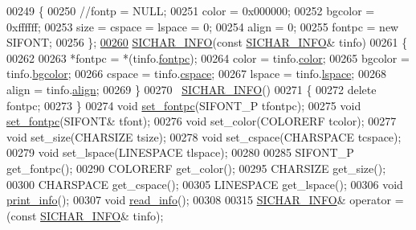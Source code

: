 \begin{DoxyCode}
00249     \{
00250         \textcolor{comment}{//fontp = NULL;}
00251         color = 0x000000;
00252         bgcolor = 0xffffff;
00253         size = cspace = lspace = 0;
00254         align = 0;
00255         fontpc = \textcolor{keyword}{new} SIFONT;
00256     \};
\hyperlink{class_s_i_c_h_a_r___i_n_f_o_a21b428740b8332500ae61f43b700d6b2}{00260}     \hyperlink{class_s_i_c_h_a_r___i_n_f_o_a21b428740b8332500ae61f43b700d6b2}{SICHAR\_INFO}(\textcolor{keyword}{const} \hyperlink{class_s_i_c_h_a_r___i_n_f_o}{SICHAR\_INFO}& tinfo) 
00261     \{
00262 
00263         *fontpc = *(tinfo.\hyperlink{class_s_i_c_h_a_r___i_n_f_o_a8d998c494943882d98981f79f620460d}{fontpc});
00264         color = tinfo.\hyperlink{class_s_i_c_h_a_r___i_n_f_o_ab9605aad10f9e033ed8e004468beeab9}{color};
00265         bgcolor = tinfo.\hyperlink{class_s_i_c_h_a_r___i_n_f_o_a838a052749c0c04c6f20c633b1cc4432}{bgcolor};
00266         cspace = tinfo.\hyperlink{class_s_i_c_h_a_r___i_n_f_o_a575d876eda778563dec0f72bd4bc06ea}{cspace};
00267         lspace = tinfo.\hyperlink{class_s_i_c_h_a_r___i_n_f_o_ace4bad34a55f914a2fbbdeb8f9a22bae}{lspace};
00268         align = tinfo.\hyperlink{class_s_i_c_h_a_r___i_n_f_o_a698a16c3b045894991c8aa2982190c7e}{align};
00269     \}
00270     ~\hyperlink{class_s_i_c_h_a_r___i_n_f_o}{SICHAR\_INFO}()   
00271     \{
00272         \textcolor{keyword}{delete} fontpc;
00273     \}
00274     \textcolor{keywordtype}{void} \hyperlink{class_s_i_c_h_a_r_n_o_d_e_aad179bc8f8fc9a4789e0b9ba06ecef9a}{set\_fontpc}(SIFONT\_P tfontpc);    
00275     \textcolor{keywordtype}{void} \hyperlink{class_s_i_c_h_a_r_n_o_d_e_aad179bc8f8fc9a4789e0b9ba06ecef9a}{set\_fontpc}(SIFONT& tfont);   
00276     \textcolor{keywordtype}{void} set\_color(COLORERF tcolor);    
00277     \textcolor{keywordtype}{void} set\_size(CHARSIZE tsize);  
00278     \textcolor{keywordtype}{void} set\_cspace(CHARSPACE tcspace); 
00279     \textcolor{keywordtype}{void} set\_lspace(LINESPACE tlspace); 
00280 
00285     SIFONT\_P get\_fontpc();  
00290     COLORERF get\_color();   
00295     CHARSIZE get\_size();
00300     CHARSPACE get\_cspace();
00305     LINESPACE get\_lspace();
00306     \textcolor{keywordtype}{void} \hyperlink{class_s_i_c_h_a_r_n_o_d_e_a4b4d71bb1d49d56399586b214897bec4}{print\_info}();    
00307     \textcolor{keywordtype}{void} \hyperlink{class_s_i_c_h_a_r_n_o_d_e_ae51d8c92371116aedf5510bb3096104c}{read\_info}();  
00308 
00315     \hyperlink{class_s_i_c_h_a_r___i_n_f_o}{SICHAR\_INFO}& operator = (\textcolor{keyword}{const} \hyperlink{class_s_i_c_h_a_r___i_n_f_o}{SICHAR\_INFO}& tinfo);   

\end{DoxyCode}
